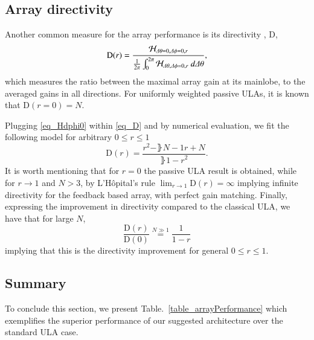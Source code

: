 \subsection*{Array directivity}
Another common measure for the array performance is its directivity \cite{VanTrees2002DetectionIV}, $\mathrm{D}$,
\begin{equation}\label{eq_D}
    \mathrm{D}(r) = \frac{\Hr_{\dTheta=0,\dPhi=0,r}}{\frac{1}{2\pi}\int_{0}^{2\pi}\Hr_{\dTheta,\dPhi=0,r}\ d\dTheta},
\end{equation}
which measures the ratio between the maximal array gain at its mainlobe, to the averaged gains in all directions. For uniformly weighted passive ULAs, it is known \cite{VanTrees2002DetectionIV} that $\mathrm{D}(r=0) = N$.
\par Plugging \eqref{eq_Hdphi0} within \eqref{eq_D} and by numerical evaluation, we fit the following model for arbitrary $0\leq r\leq 1$
\begin{equation}\label{eq_D}
    \mathrm{D}(r) = \frac{r^{2}-\rBrace{N-1}r+N}{\rBrace{1-r}^{2}}.
\end{equation}
It is worth mentioning that for $r=0$ the passive ULA result is obtained, while for $r\to1$ and $N>3$, by L'Hôpital's rule $ \lim_{r\rightarrow 1}\mathrm{D}(r)=\infty$ implying infinite directivity for the feedback based array, with perfect gain matching. Finally, expressing the improvement in directivity compared to the classical ULA, we have that for large $N$,
\begin{equation}\label{eq_Dimprovement}
\frac{\mathrm{D}(r)}{\mathrm{D}(0)}\overset{N\gg1}{=}\frac{1}{1-r}
\end{equation}
implying that this is the directivity improvement for general $0\leq r \leq 1$.
\subsection*{Summary}
To conclude this section, we present Table.~\ref{table_arrayPerformance} which exemplifies the superior performance of our suggested architecture over the standard ULA case.
\begin{table}[h!]
    \caption{Comparing performances of classical ULA and the proposed feedback based architecture, with gain mismatch $r$.}
    \centering
    \label{table_arrayPerformance}
\end{table}